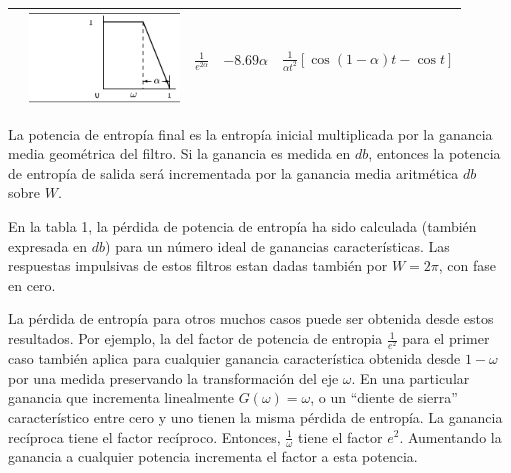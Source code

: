 \begin{table}[!ht]
\begin{center}
\begin{tabular}{|m{1mm}m{40mm}|m{20mm}|m{15mm}|m{35mm}|}
\hline
& \includegraphics[width=40mm]{./Imagenes/Table15.png} & $\frac{1}{e^{2\alpha}}$ & $-8.69\alpha$ & $\frac{1}{\alpha t^{2}} \left[ \cos \left( 1 - \alpha \right) t - \cos t \right]$ \\
\hline
\end{tabular}
\end{center}
\end{table}

La potencia de entrop\'ia final es la entrop\'ia inicial multiplicada
por la ganancia media geom\'etrica del filtro. Si la ganancia es
medida en $db$, entonces la potencia de entrop\'ia de salida ser\'a
incrementada por la ganancia media aritm\'etica $db$ sobre $W$.

En la tabla 1, la p\'erdida de potencia de entrop\'ia ha sido
calculada (tambi\'en expresada en $db$) para un n\'umero ideal de
ganancias caracter\'isticas. Las respuestas impulsivas de estos
filtros estan dadas tambi\'en por $W = 2 \pi$, con fase en cero.

La p\'erdida de entrop\'ia para otros muchos casos puede ser obtenida
desde estos resultados. Por ejemplo, la del factor de potencia de
entrop\;ia $\frac{1}{e^{2}}$ para el primer caso tambi\'en aplica para
cualquier ganancia caracter\'istica obtenida desde $1-\omega$ por una
medida preservando la transformaci\'on del eje $\omega$. En una
particular ganancia que incrementa linealmente $G \left (\omega
\right) = \omega$, o un ``diente de sierra'' caracter\'istico entre cero y
uno tienen la misma p\'erdida de entrop\'ia. La ganancia rec\'iproca
tiene el factor rec\'iproco. Entonces, $\frac{1}{\omega}$ tiene el
factor $e^{2}$. Aumentando la ganancia a cualquier potencia incrementa
el factor a esta potencia.

\clearpage
